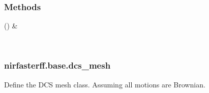 \documentclass[letterpaper,10pt,english]{sphinxmanual}
\begin{document}
\begin{fulllineitems}
\begin{fulllineitems}
\begin{quote}
\begin{description}
\end{description}\end{quote}

\end{fulllineitems}


\begin{fulllineitems}
\label{\detokenize{_autosummary/nirfasterff.base.data.meshvol:nirfasterff.base.data.meshvol.__init__}}
\pysigstartsignatures
\pysiglinewithargsret
{}
{}
{}
\pysigstopsignatures
\end{fulllineitems}

\subsubsection*{Methods}


\begin{savenotes}\sphinxattablestart
\sphinxthistablewithglobalstyle
\sphinxthistablewithnovlinesstyle
\centering
\begin{tabulary}{\linewidth}[t]{}
\sphinxtoprule
\sphinxtableatstartofbodyhook
\sphinxAtStartPar
{\hyperref[\detokenize{_autosummary/nirfasterff.base.data.meshvol:nirfasterff.base.data.meshvol.__init__}]{}}()
&
\sphinxAtStartPar

\\
\sphinxbottomrule
\end{tabulary}
\sphinxtableafterendhook\par
\sphinxattableend\end{savenotes}

\end{fulllineitems}


\sphinxstepscope


\subsubsection{nirfasterff.base.dcs\_mesh}
\label{\detokenize{_autosummary/nirfasterff.base.dcs_mesh:module-nirfasterff.base.dcs_mesh}}\label{\detokenize{_autosummary/nirfasterff.base.dcs_mesh:nirfasterff-base-dcs-mesh}}\label{\detokenize{_autosummary/nirfasterff.base.dcs_mesh::doc}}
\sphinxAtStartPar
Define the DCS mesh class. Assuming all motions are Brownian.
\end{document}
